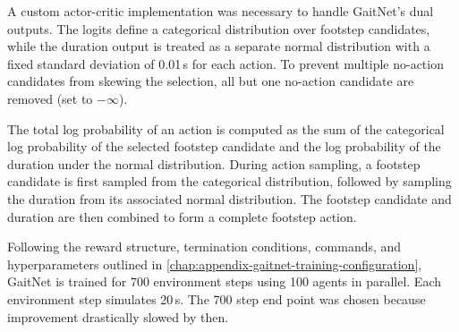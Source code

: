A custom actor-critic implementation was necessary to handle
GaitNet's dual outputs. The logits define a categorical distribution
over footstep candidates, while the duration output is treated as a
separate normal distribution with a fixed standard deviation of
0.01\,s for each action. To prevent multiple no-action candidates
from skewing the selection, all but one no-action candidate are
removed (set to $-\infty$).

The total log probability of an action is computed as the sum of the
categorical log probability of the selected footstep candidate and
the log probability of the duration under the normal distribution.
During action sampling, a footstep candidate is first sampled from
the categorical distribution, followed by sampling the duration from
its associated normal distribution. The footstep candidate and
duration are then combined to form a complete footstep action.

Following the reward structure, termination conditions, commands, and
hyperparameters outlined in
\autoref{chap:appendix-gaitnet-training-configuration}, GaitNet is
trained for 700 environment steps using 100 agents in parallel.
Each environment step simulates 20\,s. The 700 step end point was chosen
because improvement drastically slowed by then.
